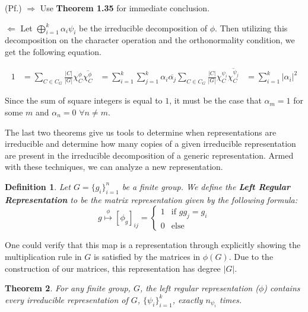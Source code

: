 \documentclass[10pt]{ucthesis}
\newtheorem{definition}{Definition}[chapter]
\newtheorem{theorem}[definition]{Theorem}
\begin{document}
\noindent (Pf.) $\Rightarrow$ Use \textbf{Theorem 1.35} for immediate conclusion. 

\hspace{2mm}$\Leftarrow$ Let $\bigoplus_{i=1}^k \alpha_i\psi_i$ be the irreducible decomposition of $\phi$. Then utilizing this decomposition on the character operation and the orthonormality condition, we get the following equation.

\begin{equation}
	\begin{aligned}
		1 &=\sum_{C\in C_G} \frac{|C|}{|G|}\chi^\phi_C \overline{\chi^\phi_C} &= \sum_{i=1}^k \sum_{j=1}^k \alpha_i \overline{\alpha_j} \sum_{C\in C_G} \frac{|C|}{|G|} \chi^{\psi_i}_C \overline{\chi^{\psi_j}_C} &= \sum_{i=1}^k |\alpha_i|^2
	\end{aligned}
\end{equation}

Since the sum of square integers is equal to $1$, it must be the case that $\alpha_m = 1$ for some $m$ and $\alpha_n=0$  $\forall n \neq m$. \cite{Tung} \qedsymbol


The last two theorems give us tools to determine when representations are irreducible and determine how many copies of a given irreducible representation are present in the irreducible decomposition of a generic representation. Armed with these techniques, we can analyze a new representation.

\begin{definition}
	Let $G=\{g_i\}^n_{i=1}$ be a finite group. We define the \textbf{Left Regular Representation} to be the matrix representation given by the following formula:
$$g\stackrel{\phi}{\mapsto} [\phi_g]_{ij} = \begin{cases}
								1 & \text{if } gg_j = g_i \\
								0 & \text{else}
							\end{cases}$$
\end{definition}

One could verify that this map is a representation through explicitly showing the multiplication rule in $G$ is satisfied by the matrices in $\phi(G)$. Due to the construction of our matrices, this representation has degree $|G|$. 

\begin{theorem}
	For any finite group, $G$, the left regular representation ($\phi$) contains every irreducible representation of $G$, $\{\psi_i\}_{i=1}^k$, exactly $n_{\psi_i}$ times.
\end{theorem}
\end{document}
